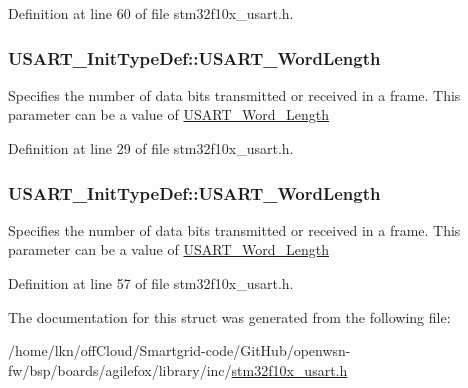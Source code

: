 Definition at line 60 of file stm32f10x\+\_\+usart.\+h.

\subsubsection[{\texorpdfstring{U\+S\+A\+R\+T\+\_\+\+Word\+Length}{USART_WordLength}}]{ U\+S\+A\+R\+T\+\_\+\+Init\+Type\+Def\+::\+U\+S\+A\+R\+T\+\_\+\+Word\+Length}\hypertarget{struct_u_s_a_r_t___init_type_def_a060220f98ef8038e8fbca0c957b06c69}{}\label{struct_u_s_a_r_t___init_type_def_a060220f98ef8038e8fbca0c957b06c69}
Specifies the number of data bits transmitted or received in a frame. This parameter can be a value of \hyperlink{group___u_s_a_r_t___word___length}{U\+S\+A\+R\+T\+\_\+\+Word\+\_\+\+Length} 

Definition at line 29 of file stm32f10x\+\_\+usart.\+h.

\subsubsection[{\texorpdfstring{U\+S\+A\+R\+T\+\_\+\+Word\+Length}{USART_WordLength}}]{ U\+S\+A\+R\+T\+\_\+\+Init\+Type\+Def\+::\+U\+S\+A\+R\+T\+\_\+\+Word\+Length}\hypertarget{struct_u_s_a_r_t___init_type_def_a16d1fb7ccc2b51964f1bcfcbfba6d89d}{}\label{struct_u_s_a_r_t___init_type_def_a16d1fb7ccc2b51964f1bcfcbfba6d89d}
Specifies the number of data bits transmitted or received in a frame. This parameter can be a value of \hyperlink{group___u_s_a_r_t___word___length}{U\+S\+A\+R\+T\+\_\+\+Word\+\_\+\+Length} 

Definition at line 57 of file stm32f10x\+\_\+usart.\+h.



The documentation for this struct was generated from the following file\+:\begin{DoxyCompactItemize}
\item 
/home/lkn/off\+Cloud/\+Smartgrid-\/code/\+Git\+Hub/openwsn-\/fw/bsp/boards/agilefox/library/inc/\hyperlink{agilefox_2library_2inc_2stm32f10x__usart_8h}{stm32f10x\+\_\+usart.\+h}\end{DoxyCompactItemize}
